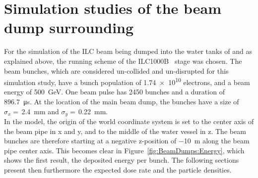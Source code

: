 \section{Simulation studies of the beam dump surrounding}
\label{BeamDumps:sim_surrounding}
For the \fluka simulation of the ILC beam being dumped into the water tanks of \designone and \designtwo as explained above, the running scheme of the ILC1000B~\cite[p. 11]{TDR1} stage was chosen.
The beam bunches, which are considered un-collided and un-disrupted for this simulation study, have a bunch population of \num{1.74e10} electrons, and a beam energy of \SI{500}{\GeV}.
One beam pulse has \num{2450} bunches and a duration of \SI{896.7}{\micro\second}.
At the location of the main beam dump, the bunches have a size of $\sigma_x = $\,\SI{2.4}{\milli\meter} and $\sigma_y = $\,\SI{0.22}{\milli\meter}.
\\In the \fluka model, the origin of the world coordinate system is set to the center axis of the beam pipe in x and y, and to the middle of the water vessel in z.
The beam bunches are therefore starting at a negative z-position of \SI{-10}{\meter} along the beam pipe center axis.
This becomes clear in Figure~\ref{fig:BeamDumps:Energy}, which shows the first \fluka result, the deposited energy per bunch.
The following sections present then furthermore the expected dose rate and the particle densities.

